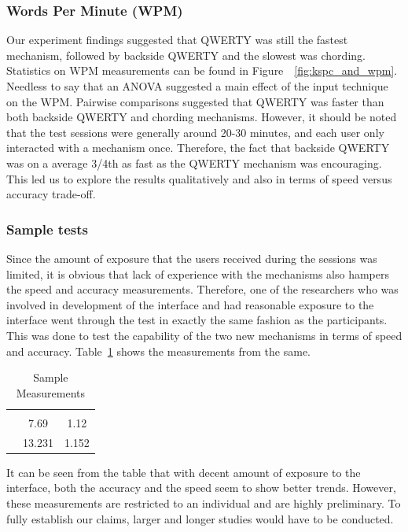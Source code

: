 \subsubsection{Words Per Minute (WPM)}

Our experiment findings suggested that QWERTY was still the fastest mechanism, followed by backside QWERTY and the slowest was chording. Statistics on WPM measurements can be found in Figure~~\ref{fig:kspc_and_wpm}. Needless to say that an ANOVA suggested a main effect of the input technique on the WPM. Pairwise comparisons suggested that QWERTY was faster than both backside QWERTY and chording mechanisms. However, it should be noted that the test sessions were generally around 20-30 minutes, and each user only interacted with a mechanism once. Therefore, the fact that backside QWERTY was on a average 3/4th as fast as the QWERTY mechanism was encouraging. This led us to explore the results qualitatively and also in terms of speed versus accuracy trade-off.


\subsubsection{Sample tests}

Since the amount of exposure that the users received during the sessions was limited, it is obvious that lack of experience with the mechanisms also hampers the speed and accuracy measurements. Therefore, one of the researchers who was involved in
development of the interface and had reasonable exposure to the
interface went through the test in exactly the same fashion as the
participants. This was done to test the capability of the two new
mechanisms in terms of speed and
accuracy. Table~\ref{tab:StatisticsForTestCorpora} shows the
measurements from the same.

\begin{table}
	\centering
		\begin{tabular}{rcc} 
		                         & \color{grey}{WPM}    & \color{grey}{KSPC} \\ 
                   \color{grey}{Chording} & 7.69   & 1.12 \\ 
                   \color{grey}{Backside QWERTY} & 13.231 & 1.152 \\ 
		\end{tabular}
	\caption{Sample Measurements}
	\label{tab:StatisticsForTestCorpora}
\end{table}

It can be seen from the table that with decent amount of exposure to
the interface, both the accuracy and the speed seem to show better
trends. However, these measurements are restricted to an individual
and are highly preliminary. To fully establish our claims, larger and
longer studies would have to be conducted.

